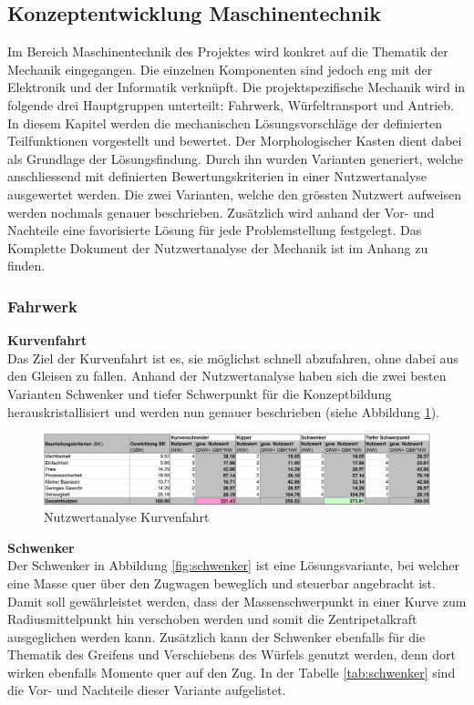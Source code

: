 \documentclass[../../../main.tex]{subfiles}
\begin{document}
    \subsection{Konzeptentwicklung Maschinentechnik}
    Im Bereich Maschinentechnik des Projektes wird konkret auf die Thematik der Mechanik eingegangen. Die einzelnen Komponenten sind jedoch eng mit der Elektronik und der Informatik verknüpft. Die projektspezifische Mechanik wird in folgende drei Hauptgruppen unterteilt: Fahrwerk, Würfeltransport und Antrieb. In diesem Kapitel werden die mechanischen Lösungsvorschläge der definierten Teilfunktionen vorgestellt und bewertet. Der Morphologischer Kasten dient dabei als Grundlage der Lösungsfindung. Durch ihn wurden Varianten generiert, welche anschliessend mit definierten Bewertungskriterien in einer Nutzwertanalyse ausgewertet werden. Die zwei Varianten, welche den grössten Nutzwert aufweisen werden nochmals genauer beschrieben. Zusätzlich wird anhand der Vor- und Nachteile eine favorisierte Lösung für jede Problemstellung festgelegt. Das Komplette Dokument der Nutzwertanalyse der Mechanik ist im Anhang zu finden.

    \subsubsection{Fahrwerk}
    \textbf{Kurvenfahrt}\\
    Das Ziel der Kurvenfahrt ist es, sie möglichst schnell abzufahren, ohne dabei aus den Gleisen zu fallen. Anhand der Nutzwertanalyse haben sich die zwei besten Varianten Schwenker und tiefer Schwerpunkt für die Konzeptbildung herauskristallisiert und werden nun genauer beschrieben (siehe Abbildung \ref{fig:kurvenfahrt}).

    \begin{figure}[H] %
        \centering
        \includegraphics[width=1\textwidth]{Kurvenfahrt}
        \caption{Nutzwertanalyse Kurvenfahrt}
        \label{fig:kurvenfahrt}
    \end{figure}
    
    \textbf{Schwenker}\\
    Der Schwenker in Abbildung \ref{fig:schwenker} ist eine Lösungsvariante, bei welcher eine Masse quer über den Zugwagen beweglich und steuerbar angebracht ist. Damit soll gewährleistet werden, dass der Massenschwerpunkt in einer Kurve zum Radiusmittelpunkt hin verschoben werden und somit die Zentripetalkraft ausgeglichen werden kann. Zusätzlich kann der Schwenker ebenfalls für die Thematik des Greifens und Verschiebens des Würfels genutzt werden, denn dort wirken ebenfalls Momente quer auf den Zug. In der Tabelle \ref{tab:schwenker} sind die Vor- und Nachteile dieser Variante aufgelistet.
    
\end{document}
